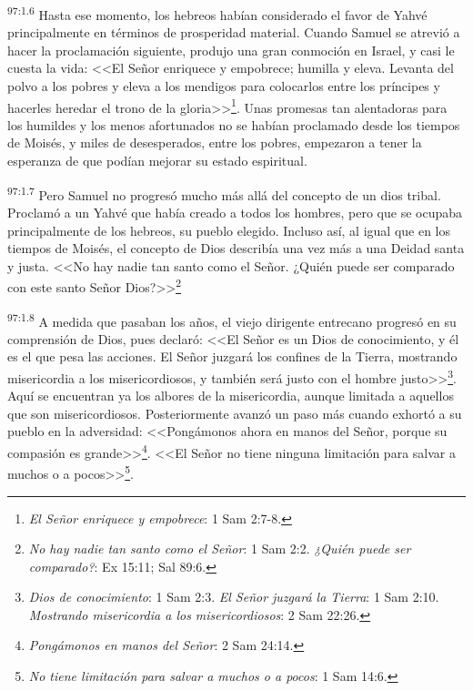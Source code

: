 \par
\textsuperscript{97:1.6} Hasta ese momento, los hebreos habían considerado el favor de Yahvé principalmente en términos de prosperidad material. Cuando Samuel se atrevió a hacer la proclamación siguiente, produjo una gran conmoción en Israel, y casi le cuesta la vida: <<El Señor enriquece y empobrece; humilla y eleva. Levanta del polvo a los pobres y eleva a los mendigos para colocarlos entre los príncipes y hacerles heredar el trono de la gloria>>\footnote{\textit{El Señor enriquece y empobrece}: 1 Sam 2:7-8.}. Unas promesas tan alentadoras para los humildes y los menos afortunados no se habían proclamado desde los tiempos de Moisés, y miles de desesperados, entre los pobres, empezaron a tener la esperanza de que podían mejorar su estado espiritual.

\par
\textsuperscript{97:1.7} Pero Samuel no progresó mucho más allá del concepto de un dios tribal. Proclamó a un Yahvé que había creado a todos los hombres, pero que se ocupaba principalmente de los hebreos, su pueblo elegido. Incluso así, al igual que en los tiempos de Moisés, el concepto de Dios describía una vez más a una Deidad santa y justa. <<No hay nadie tan santo como el Señor. ¿Quién puede ser comparado con este santo Señor Dios?>>\footnote{\textit{No hay nadie tan santo como el Señor}: 1 Sam 2:2. \textit{¿Quién puede ser comparado?}: Ex 15:11; Sal 89:6.}

\par
\textsuperscript{97:1.8} A medida que pasaban los años, el viejo dirigente entrecano progresó en su comprensión de Dios, pues declaró: <<El Señor es un Dios de conocimiento, y él es el que pesa las acciones. El Señor juzgará los confines de la Tierra, mostrando misericordia a los misericordiosos, y también será justo con el hombre justo>>\footnote{\textit{Dios de conocimiento}: 1 Sam 2:3. \textit{El Señor juzgará la Tierra}: 1 Sam 2:10. \textit{Mostrando misericordia a los misericordiosos}: 2 Sam 22:26.}. Aquí se encuentran ya los albores de la misericordia, aunque limitada a aquellos que son misericordiosos. Posteriormente avanzó un paso más cuando exhortó a su pueblo en la adversidad: <<Pongámonos ahora en manos del Señor, porque su compasión es grande>>\footnote{\textit{Pongámonos en manos del Señor}: 2 Sam 24:14.}. <<El Señor no tiene ninguna limitación para salvar a muchos o a pocos>>\footnote{\textit{No tiene limitación para salvar a muchos o a pocos}: 1 Sam 14:6.}.

